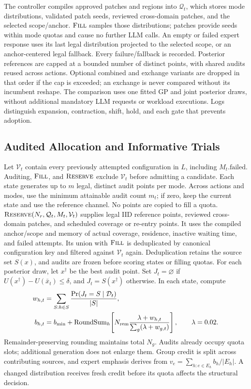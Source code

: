 \documentclass[runningheads]{llncs}
\begin{document}
The controller compiles approved patches and regions into $\mathcal Q_t$,
which stores mode distributions, validated patch seeds, reviewed cross-domain
patches, and the selected scope/anchor. $\textsc{Fill}$ samples those
distributions; patches provide seeds within mode quotas and cause no further
LLM calls. An empty or failed expert response uses its last legal
distribution projected to the selected scope, or an anchor-centered legal
fallback. Every failure/fallback is recorded. Posterior references are
capped at a bounded number of distinct points, with shared audits reused
across actions. Optional combined and exchange variants are dropped in that
order if the cap is exceeded; an exchange is never compared without its
incumbent reshape. The comparison uses one fitted GP and joint posterior
draws, without additional mandatory LLM requests or workload executions.
Logs distinguish expansion, contraction, shift, hold, and each gate that
prevents adoption.

\subsection{Audited Allocation and Informative Trials}
\label{sec:candidate-selection}

Let $\mathcal V_t$ contain every previously attempted configuration in $L$,
including $M_t.\mathrm{failed}$. Auditing, $\textsc{Fill}$, and
$\textsc{Reserve}$ exclude $\mathcal V_t$ before admitting a candidate.
Each state generates up to $m$ legal, distinct audit points per mode.
Across actions and modes, use the minimum attainable audit count
$m_t$; if zero, keep the current state and use the reference channel.
No points are copied to fill a quota.
$\textsc{Reserve}(N_r,\mathcal Q_t,M_t,\mathcal V_t)$ supplies legal IID
reference points, reviewed cross-domain patches, and scheduled coverage or
re-entry points. It uses the compiled anchor/scope and memory of actual
coverage, residence, inactive waiting time, and failed attempts. Its union
with $\textsc{Fill}$ is deduplicated by canonical configuration key and
filtered against $\mathcal V_t$ again. Deduplication retains the source
set $S(x)$, and audits are frozen before scoring states or filling quotas.
For each posterior draw, let $x^\dagger$ be the best audit point. Set
$J_t=\varnothing$ if $U(x^\dagger)-U(\bar x_t)\leq\delta$, and
$J_t=S(x^\dagger)$ otherwise. In each state, compute
\begin{equation}
\begin{aligned}
 w_{h,t}&=\sum_{S:h\in S}\frac{\Pr(J_t=S\mid\mathcal D_t)}{|S|},\\
 b_{h,t}&=b_{\min}+\operatorname{RoundSum}_h\!\left[
 N_{\rm rem}\frac{\lambda+w_{h,t}}{\sum_g(\lambda+w_{g,t})}\right],
 \qquad\lambda=0.02.
\end{aligned}
\label{eq:ct-budget-update}
\end{equation}
Remainder-preserving rounding maintains total $N_g$. Audits already occupy
quota slots; additional generation does not enlarge them. Group credit is
split across contributing sources, and expert emphasis derives from
$v_e=\sum_{h:e\in E_h}b_h/|E_h|$. A changed distribution receives fresh
credit before its quota affects the structural decision.
\end{document}
